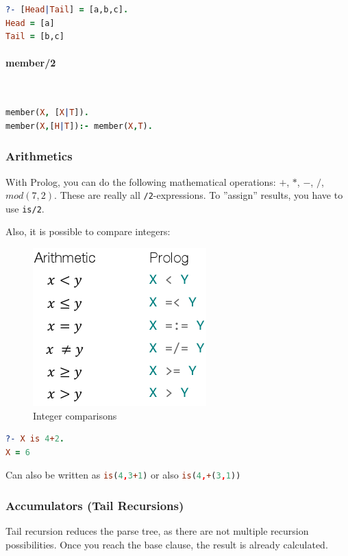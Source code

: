 \begin{lstlisting}[language=Prolog]
?- [Head|Tail] = [a,b,c].
Head = [a]
Tail = [b,c]
\end{lstlisting}


\paragraph{member/2} \hfill \\

\begin{lstlisting}[language=Prolog]
member(X, [X|T]).
member(X,[H|T]):- member(X,T).
\end{lstlisting}

\subsubsection{Arithmetics}

With Prolog, you can do the following mathematical operations: $+$, $*$, $-$, $/$, $mod(7,2)$. These are really all \lstinline|/2|-expressions. To ''assign'' results, you have to use \lstinline|is/2|.

Also, it is possible to compare integers:
\begin{figure}[h]
\centering
\includegraphics[width=0.2\linewidth]{images/integer_comparison}
\caption{Integer comparisons}
\label{fig:integercomparison}
\end{figure}


\begin{lstlisting}[language=Prolog]
?- X is 4+2.
X = 6
\end{lstlisting}

Can also be written as \lstinline[language=Prolog]|is(4,3+1)| or also \lstinline[language=Prolog]|is(4,+(3,1))|

\subsubsection{Accumulators (Tail Recursions)}

Tail recursion reduces the parse tree, as there are not multiple recursion possibilities. Once you reach the base clause, the result is already calculated.

